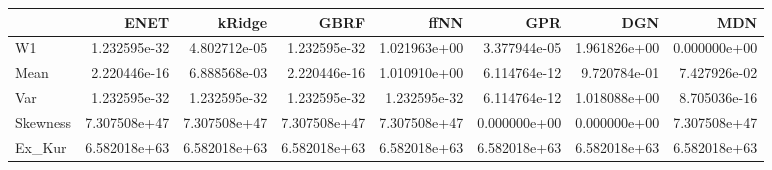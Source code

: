 \begin{tabular}{lrrrrrrr}
\toprule
{} &          ENET &        kRidge &          GBRF &          ffNN &           GPR &           DGN &           MDN \\
\midrule
W1       &  1.232595e-32 &  4.802712e-05 &  1.232595e-32 &  1.021963e+00 &  3.377944e-05 &  1.961826e+00 &  0.000000e+00 \\
Mean     &  2.220446e-16 &  6.888568e-03 &  2.220446e-16 &  1.010910e+00 &  6.114764e-12 &  9.720784e-01 &  7.427926e-02 \\
Var      &  1.232595e-32 &  1.232595e-32 &  1.232595e-32 &  1.232595e-32 &  6.114764e-12 &  1.018088e+00 &  8.705036e-16 \\
Skewness &  7.307508e+47 &  7.307508e+47 &  7.307508e+47 &  7.307508e+47 &  0.000000e+00 &  0.000000e+00 &  7.307508e+47 \\
Ex\_Kur   &  6.582018e+63 &  6.582018e+63 &  6.582018e+63 &  6.582018e+63 &  6.582018e+63 &  6.582018e+63 &  6.582018e+63 \\
\bottomrule
\end{tabular}
